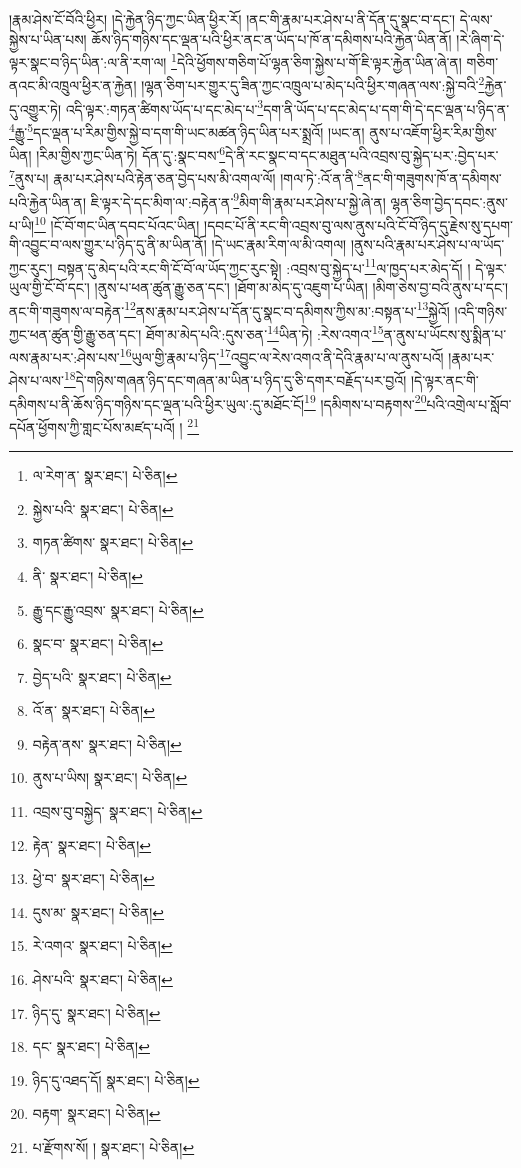 །རྣམ་ཤེས་ངོ་བོའི་ཕྱིར། །དེ་རྐྱེན་ཉིད་ཀྱང་ཡིན་ཕྱིར་རོ། །ནང་གི་རྣམ་པར་ཤེས་པ་ནི་དོན་དུ་སྣང་བ་དང་། དེ་ལས་སྐྱེས་པ་ཡིན་པས། ཆོས་ཉིད་གཉིས་དང་ལྡན་པའི་ཕྱིར་ནང་ན་ཡོད་པ་ཁོ་ན་དམིགས་པའི་རྐྱེན་ཡིན་ནོ། །རེ་ཞིག་དེ་ལྟར་སྣང་བ་ཉིད་ཡིན་:ལ་ནི་རག་ལ། \footnote{ལ་རེག་ན་  སྣར་ཐང་།  པེ་ཅིན། }དེའི་ཕྱོགས་གཅིག་པོ་ལྷན་ཅིག་སྐྱེས་པ་གོ་ཇི་ལྟར་རྐྱེན་ཡིན་ཞེ་ན། གཅིག་ནའང་མི་འཁྲུལ་ཕྱིར་ན་རྐྱེན། །ལྷན་ཅིག་པར་གྱུར་དུ་ཟིན་ཀྱང་འཁྲུལ་པ་མེད་པའི་ཕྱིར་གཞན་ལས་:སྐྱེ་བའི་\footnote{སྐྱེས་པའི་  སྣར་ཐང་།  པེ་ཅིན། }རྐྱེན་དུ་འགྱུར་ཏེ། འདི་ལྟར་:གཏན་ཚིགས་ཡོད་པ་དང་མེད་པ་\footnote{གཏན་ཚིགས་  སྣར་ཐང་།  པེ་ཅིན། }དག་ནི་ཡོད་པ་དང་མེད་པ་དག་གི་དེ་དང་ལྡན་པ་ཉིད་ན་\footnote{ནི་  སྣར་ཐང་།  པེ་ཅིན། }རྒྱུ་\footnote{རྒྱུ་དང་རྒྱུ་འབྲས་  སྣར་ཐང་།  པེ་ཅིན། }དང་ལྡན་པ་རིམ་གྱིས་སྐྱེ་བ་དག་གི་ཡང་མཚན་ཉིད་ཡིན་པར་སྨྲའོ། །ཡང་ན། ནུས་པ་འཇོག་ཕྱིར་རིམ་གྱིས་ཡིན། །རིམ་གྱིས་ཀྱང་ཡིན་ཏེ། དོན་དུ་:སྣང་བས་\footnote{སྣང་བ་  སྣར་ཐང་།  པེ་ཅིན། }དེ་ནི་རང་སྣང་བ་དང་མཐུན་པའི་འབྲས་བུ་སྐྱེད་པར་:བྱེད་པར་\footnote{བྱེད་པའི་  སྣར་ཐང་།  པེ་ཅིན། }ནུས་པ། རྣམ་པར་ཤེས་པའི་རྟེན་ཅན་བྱེད་པས་མི་འགལ་ལོ། །གལ་ཏེ་:འོ་ན་ནི་\footnote{འོ་ན་  སྣར་ཐང་།  པེ་ཅིན། }ནང་གི་གཟུགས་ཁོ་ན་དམིགས་པའི་རྐྱེན་ཡིན་ན། ཇི་ལྟར་དེ་དང་མིག་ལ་:བརྟེན་ན་\footnote{བརྟེན་ནས་  སྣར་ཐང་།  པེ་ཅིན། }མིག་གི་རྣམ་པར་ཤེས་པ་སྐྱེ་ཞེ་ན། ལྷན་ཅིག་བྱེད་དབང་:ནུས་པ་ཡི།\footnote{ནུས་པ་ཡིས།  སྣར་ཐང་།  པེ་ཅིན། } །ངོ་བོ་གང་ཡིན་དབང་པོའང་ཡིན། །དབང་པོ་ནི་རང་གི་འབྲས་བུ་ལས་ནུས་པའི་ངོ་བོ་ཉིད་དུ་རྗེས་སུ་དཔག་གི་འབྱུང་བ་ལས་གྱུར་པ་ཉིད་དུ་ནི་མ་ཡིན་ནོ། །དེ་ཡང་རྣམ་རིག་ལ་མི་འགལ། །ནུས་པའི་རྣམ་པར་ཤེས་པ་ལ་ཡོད་ཀྱང་རུང་། བསྟན་དུ་མེད་པའི་རང་གི་ངོ་བོ་ལ་ཡོད་ཀྱང་རུང་སྟེ། :འབྲས་བུ་སྐྱེད་པ་\footnote{འབྲས་བུ་བསྐྱེད་  སྣར་ཐང་།  པེ་ཅིན། }ལ་ཁྱད་པར་མེད་དོ། །
དེ་ལྟར་ཡུལ་གྱི་ངོ་བོ་དང་། །ནུས་པ་ཕན་ཚུན་རྒྱུ་ཅན་དང་། །ཐོག་མ་མེད་དུ་འཇུག་པ་ཡིན། །མིག་ཅེས་བྱ་བའི་ནུས་པ་དང་། ནང་གི་གཟུགས་ལ་བརྟེན་\footnote{རྟེན་  སྣར་ཐང་།  པེ་ཅིན། }ནས་རྣམ་པར་ཤེས་པ་དོན་དུ་སྣང་བ་དམིགས་ཀྱིས་མ་:བསྟན་པ་\footnote{ཕྱེ་བ་  སྣར་ཐང་།  པེ་ཅིན། }སྐྱེའོ། །འདི་གཉིས་ཀྱང་ཕན་ཚུན་གྱི་རྒྱུ་ཅན་དང་། ཐོག་མ་མེད་པའི་:དུས་ཅན་\footnote{དུས་མ་  སྣར་ཐང་།  པེ་ཅིན། }ཡིན་ཏེ། :རེས་འགའ་\footnote{རེ་འགའ་  སྣར་ཐང་།  པེ་ཅིན། }ན་ནུས་པ་ཡོངས་སུ་སྨིན་པ་ལས་རྣམ་པར་:ཤེས་པས་\footnote{ཤེས་པའི་  སྣར་ཐང་།  པེ་ཅིན། }ཡུལ་གྱི་རྣམ་པ་ཉིད་\footnote{ཉིད་དུ་  སྣར་ཐང་།  པེ་ཅིན། }འབྱུང་ལ་རེས་འགའ་ནི་དེའི་རྣམ་པ་ལ་ནུས་པའོ། །རྣམ་པར་ཤེས་པ་ལས་\footnote{དང་  སྣར་ཐང་།  པེ་ཅིན། }དེ་གཉིས་གཞན་ཉིད་དང་གཞན་མ་ཡིན་པ་ཉིད་དུ་ཅི་དགར་བརྗོད་པར་བྱའོ། །དེ་ལྟར་ནང་གི་དམིགས་པ་ནི་ཆོས་ཉིད་གཉིས་དང་ལྡན་པའི་ཕྱིར་ཡུལ་:དུ་མཐོང་ངོ།\footnote{ཉིད་དུ་འཐད་དོ།  སྣར་ཐང་།  པེ་ཅིན། } །དམིགས་པ་བརྟགས་\footnote{བརྟག་  སྣར་ཐང་།  པེ་ཅིན། }པའི་འགྲེལ་པ་སློབ་དཔོན་ཕྱོགས་ཀྱི་གླང་པོས་མཛད་པའོ། ། \footnote{པ་རྫོགས་སོ། །   སྣར་ཐང་།  པེ་ཅིན། }